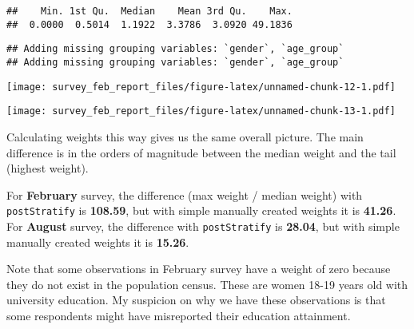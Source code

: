 \documentclass[
]{article}
\begin{document}
\begin{verbatim}
##    Min. 1st Qu.  Median    Mean 3rd Qu.    Max. 
##  0.0000  0.5014  1.1922  3.3786  3.0920 49.1836
\end{verbatim}

\begin{verbatim}
## Adding missing grouping variables: `gender`, `age_group`
## Adding missing grouping variables: `gender`, `age_group`
\end{verbatim}

\texttt{[image: survey\_feb\_report\_files/figure-latex/unnamed-chunk-12-1.pdf]}

\texttt{[image: survey\_feb\_report\_files/figure-latex/unnamed-chunk-13-1.pdf]}

Calculating weights this way gives us the same overall picture. The main
difference is in the orders of magnitude between the median weight and
the tail (highest weight).

For \textbf{February} survey, the difference (max weight / median
weight) with \texttt{postStratify} is \textbf{108.59}, but with simple
manually created weights it is \textbf{41.26}. For \textbf{August}
survey, the difference with \texttt{postStratify} is \textbf{28.04}, but
with simple manually created weights it is \textbf{15.26}.

Note that some observations in February survey have a weight of zero
because they do not exist in the population census. These are women
18-19 years old with university education. My suspicion on why we have
these observations is that some respondents might have misreported their
education attainment.
\end{document}
